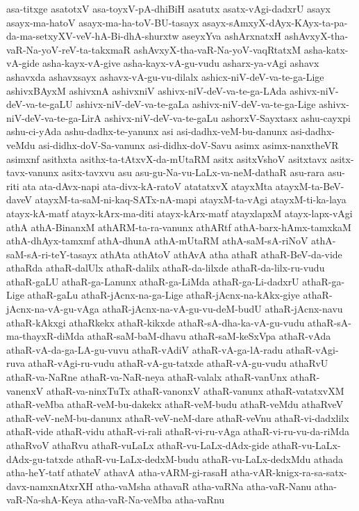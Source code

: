 {asa-titxge
asatotxV
asa-toyxV-pA-dhiBiH
asatutx
asatx-vAgi-dadxrU
asayx
asayx-ma-hatoV
asayx-ma-ha-toV-BU-tasayx
asayx-sAmxyX-dAyx-KAyx-ta-pa-da-ma-setxyXV-veV-hA-Bi-dhA-shurxtw
aseyxYva
ashArxnatxH
ashAvxyX-tha-vaR-Na-yoV-reV-ta-takxmaR
ashAvxyX-tha-vaR-Na-yoV-vaqRtatxM
asha-katx-vA-gide
asha-kayx-vA-give
asha-kayx-vA-gu-vudu
asharx-ya-vAgi
ashavx
ashavxda
ashavxsayx
ashavx-vA-gu-vu-dilalx
ashicx-niV-deV-va-te-ga-Lige
ashivxBAyxM
ashivxnA
ashivxniV
ashivx-niV-deV-va-te-ga-LAda
ashivx-niV-deV-va-te-gaLU
ashivx-niV-deV-va-te-gaLa
ashivx-niV-deV-va-te-ga-Lige
ashivx-niV-deV-va-te-ga-LirA
ashivx-niV-deV-va-te-gaLu
ashorxV-Sayxtasx
ashu-cayxpi
ashu-ci-yAda
ashu-dadhx-te-yanunx
asi
asi-dadhx-veM-bu-danunx
asi-dadhx-veMdu
asi-didhx-doV-Sa-vanunx
asi-didhx-doV-Savu
asimx
asimx-nanxtheVR
asimxnf
asithxta
asithx-ta-tAtxvX-da-mUtaRM
asitx
asitxVshoV
asitxtavx
asitx-tavx-vanunx
asitx-tavxvu
asu
asu-gu-Na-vu-LaLx-va-neM-dathaR
asu-rara
asu-riti
ata
ata-dAvx-napi
ata-divx-kA-ratoV
atatatxvX
atayxMta
atayxM-ta-BeV-daveV
atayxM-ta-saM-ni-kaq-SATx-nA-mapi
atayxM-ta-vAgi
atayxM-ti-ka-laya
atayx-kA-matf
atayx-kArx-ma-diti
atayx-kArx-matf
atayxlapxM
atayx-lapx-vAgi
athA
athA-BinanxM
athARM-ta-ra-vanunx
athARtf
athA-barx-hAmx-tamxkaM
athA-dhAyx-tamxmf
athA-dhunA
athA-mUtaRM
athA-saM-sA-riNoV
athA-saM-sA-ri-teY-tasayx
athAta
athAtoV
athAvA
atha
athaR
athaR-BeV-da-vide
athaRda
athaR-dalUlx
athaR-dalilx
athaR-da-lilxde
athaR-da-lilx-ru-vudu
athaR-gaLU
athaR-ga-Lanunx
athaR-ga-LiMda
athaR-ga-Li-dadxrU
athaR-ga-Lige
athaR-gaLu
athaR-jAcnx-na-ga-Lige
athaR-jAcnx-na-kAkx-giye
athaR-jAcnx-na-vA-gu-vAga
athaR-jAcnx-na-vA-gu-vu-deM-budU
athaR-jAcnx-navu
athaR-kAkxgi
athaRkekx
athaR-kikxde
athaR-sA-dha-ka-vA-gu-vudu
athaR-sA-ma-thayxR-diMda
athaR-saM-baM-dhavu
athaR-saM-keSxVpa
athaR-vAda
athaR-vA-da-ga-LA-gu-vuvu
athaR-vAdiV
athaR-vA-ga-lA-radu
athaR-vAgi-ruva
athaR-vAgi-ru-vudu
athaR-vA-gu-tatxde
athaR-vA-gu-vudu
athaRvU
athaR-va-NaRne
athaR-va-NaR-neya
athaR-valalx
athaR-vanUnx
athaR-vanenxV
athaR-va-ninxTuTx
athaR-vanonxV
athaR-vanunx
athaR-vatatxvXM
athaR-veMba
athaR-veM-bu-dakekx
athaR-veM-budu
athaR-veMdu
athaRveV
athaR-veV-neM-bu-danunx
athaR-veV-neM-dare
athaR-veVnu
athaR-vi-dadxlilx
athaR-vide
athaR-vidu
athaR-vi-rali
athaR-vi-ru-vAga
athaR-vi-ru-vu-da-riMda
athaRvoV
athaRvu
athaR-vuLaLx
athaR-vu-LaLx-dAdx-gide
athaR-vu-LaLx-dAdx-gu-tatxde
athaR-vu-LaLx-dedxM-budu
athaR-vu-LaLx-dedxMdu
athada
atha-heY-tatf
athateV
athavA
atha-vARM-gi-rasaH
atha-vAR-knigx-ra-sa-satx-davx-namxnAtxrXH
atha-vaMsha
athavaR
atha-vaRNa
atha-vaR-Nanu
atha-vaR-Na-shA-Keya
atha-vaR-Na-veMba
atha-vaRnu
}
